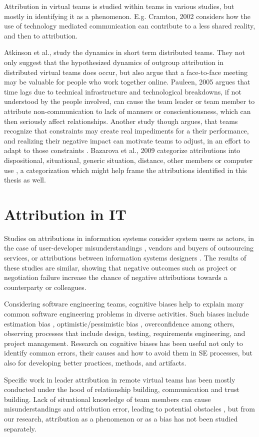 
Attribution in virtual teams is studied within teams in various studies, but mostly in identifying it as a phenomenon. E.g. Cramton, 2002 \cite{Crampton2001} considers how the use of technology mediated communication can contribute to a less shared reality, and then to attribution. 

Atkinson et al., study the dynamics in short term distributed teams. They not only suggest that the hypothesized dynamics of outgroup attribution in distributed virtual teams does occur, but also argue that a face-to-face meeting may be valuable for people who work together online. Pauleen, 2005 \cite{Pauleen2005} argues that time lags due to technical infrastructure and technological breakdowns, if not understood by the people involved, can cause the team leader or team member to attribute non-communication to lack of manners or conscientiousness, which can then seriously affect relationships. Another study though argues, that teams recognize that constraints
may create real impediments for a their performance, and realizing their negative
impact can motivate teams to adjust, in an effort to adapt to those constraints \cite{Bazarova2012}. Bazarova et al., 2009 categorize attributions into dispositional, situational, generic situation, distance, other members or computer use \cite{Bazarova2009}, a categorization which might help frame the attributions identified in this thesis as well.


\section{Attribution in IT}

Studies on attributions in information systems consider system users as actors, in the case of user-developer misunderstandings \cite{Snead2014}, vendors and buyers of outsourcing services\cite{Rouse2007}, or attributions between information systems designers \cite{Peterson2002}. The results of these studies are similar, showing that negative outcomes such as project or negotiation failure increase the chance of negative attributions towards a counterparty or colleagues. 

Considering software engineering teams, cognitive biases help to explain many common software engineering problems in diverse activities. Such biases include estimation bias \cite{Jorgensen2012}, optimistic/pessimistic bias \cite{Fleischmann2014}, overconfidence among others, observing processes that include design, testing, requirements engineering, and project management. Research on cognitive biases has been useful not only to identify common errors, their causes and how to avoid them in SE processes, but also for developing better practices, methods, and artifacts. 

Specific work in leader attribution in remote virtual teams has been mostly conducted under the hood of relationship building, communication and trust building. Lack of situational knowledge of team members can cause misunderstandings and attribution error, leading to potential obstacles  \cite{Pauleen2005}, but from our research, attribution as a phenomenon or as a bias has not been studied separately.


